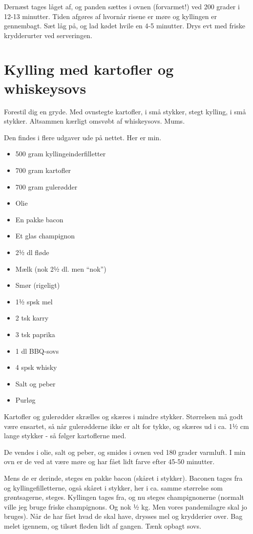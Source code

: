 \documentclass[
  letterpaper,
  DIV=11,
  numbers=noendperiod]{scrreprt}
\providecommand{\tightlist}{%
  \setlength{\itemsep}{0pt}\setlength{\parskip}{0pt}}\usepackage{longtable,booktabs,array}
\begin{document}
Dernæst tages låget af, og panden sættes i ovnen (forvarmet!) ved 200
grader i 12-13 minutter. Tiden afgøres af hvornår risene er møre og
kyllingen er gennembagt. Sæt låg på, og lad kødet hvile en 4-5 minutter.
Drys evt med friske krydderurter ved serveringen.

\hypertarget{kylling-med-kartofler-og-whiskeysovs}{%
\section{Kylling med kartofler og
whiskeysovs}\label{kylling-med-kartofler-og-whiskeysovs}}

Forestil dig en gryde. Med ovnstegte kartofler, i små stykker, stegt
kylling, i små stykker. Altsammen kærligt omsvøbt af whiskeysovs. Mums.

Den findes i flere udgaver ude på nettet. Her er min.

\begin{itemize}
\tightlist
\item
  500 gram kyllingeinderfilletter
\item
  700 gram kartofler
\item
  700 gram gulerødder
\item
  Olie
\item
  En pakke bacon
\item
  Et glas champignon
\item
  2½ dl fløde
\item
  Mælk (nok 2½ dl. men ``nok'')
\item
  Smør (rigeligt)
\item
  1½ spsk mel
\item
  2 tsk karry
\item
  3 tsk paprika
\item
  1 dl BBQ-sovs
\item
  4 spsk whisky
\item
  Salt og peber
\item
  Purløg
\end{itemize}

Kartofler og gulerødder skrælles og skæres i mindre stykker. Størrelsen
må godt være ensartet, så når gulerødderne ikke er alt for tykke, og
skæres ud i ca. 1½ cm lange stykker - så følger kartoflerne med.

De vendes i olie, salt og peber, og smides i ovnen ved 180 grader
varmluft. I min ovn er de ved at være møre og har fået lidt farve efter
45-50 minutter.

Mens de er derinde, steges en pakke bacon (skåret i stykker). Baconen
tages fra og kyllingefilletterne, også skåret i stykker, her i ca. samme
størrelse som grøntsagerne, steges. Kyllingen tages fra, og nu steges
champignonerne (normalt ville jeg bruge friske champignons. Og nok ½ kg.
Men vores pandemilagre skal jo bruges). Når de har fået hvad de skal
have, drysses mel og krydderier over. Bag melet igennem, og tilsæt
fløden lidt af gangen. Tænk opbagt sovs.
\end{document}
